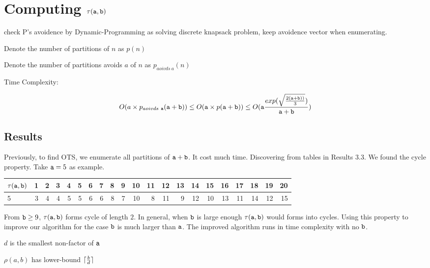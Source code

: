 \section{Computing $\tau(\mathtt{a},\mathtt{b})$}

\begin{algorithmic}
     
    \ENDIF
  \ENDFOR
\end{algorithmic}
check P's avoidence by Dynamic-Programming as solving discrete knapsack problem, keep avoidence vector when enumerating.

Denote the number of partitions of $n$ as $p(n)$

Denote the number of partitions avoids $a$ of $n$ as $p_{aoivds\ a}(n)$

Time Complexity: 

\[
O(a\times p_{aoivds\ \mathtt{a}}(\mathtt{a}+\mathtt{b}))\\
\leq O(\mathtt{a}\times p(\mathtt{a}+\mathtt{b}))\\
\leq O(\mathtt{a}\frac{exp(\sqrt{\frac{2(\mathtt{a}+\mathtt{b}))}{3} } )}{\mathtt{a}+\mathtt{b}})
\]

\pagebreak
\subsection{Results}

\pagebreak

Previously, to find OTS, we enumerate all partitions of $\mathtt{a}+\mathtt{b}$. It cost much time. Discovering from tables in Results 3.3. We found the cycle property. Take $\mathtt{a}=5$ as example.
\begin{tabular}{l|rrrrrrrrrrrrrrrrrrrr}
 $\tau(\mathtt{a},\mathtt{b})$ &  1 &  2 &  3 &  4 &  5 &  6 &  7 &  8 &  9 & 10 & 11 & 12 & 13 & 14 & 15 & 16 & 17 & 18 & 19 & 20 \\
\hline
 5        &  3 &  4 &  4 &  5 &  5 &  6 &  6 &  8 &  7 & 10 &  8 & 11 &  9 & 12 & 10 & 13 & 11 & 14 & 12 & 15 \\
\hline
\end{tabular}

From $\mathtt{b}\geq 9$, $\tau(\mathtt{a},\mathtt{b})$ forms cycle of length $2$. In general, when $\mathtt{b}$ is large enough $\tau(\mathtt{a},\mathtt{b})$ would forms into cycles.
Using this property to improve our algorithm for the case $\mathtt{b}$ is much larger than $\mathtt{a}$. The improved algorithm runs in time complexity with no $\mathtt{b}$.

\begin{definition}
$d$ is the smallest non-factor of $\mathtt{a}$
\end{definition}
\begin{lemma}
$\rho(a,b)$ has lower-bound $\lceil\frac{b}{d}\rceil$
\end{lemma} 

